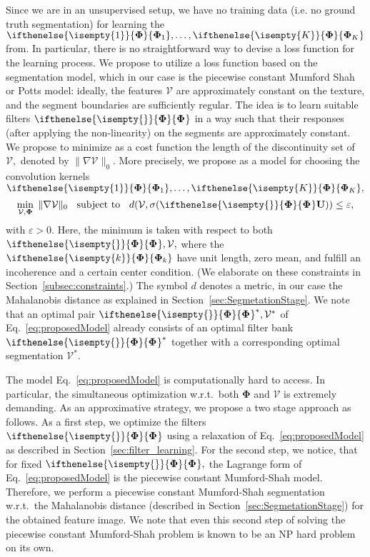 \documentclass[journal]{IEEEtran}
\newcommand{\Matrix}[1]{\mathbf{#1}}
\newcommand{\Tensor}[1]{\mathcal{#1}}
\newcommand{\St}{\textrm{\hspace{2mm} subject to \hspace{2mm}}}
\newcommand{\AOF}[1]{\ifthenelse{\isempty{#1}}{\boldsymbol{\Phi}}{\boldsymbol{\Phi}_{#1}}}
\newcommand{\SCI}{\Matrix{U}}
\begin{document}
 
Since we are in an unsupervised setup, we have no training data (i.e. no ground truth segmentation) 
for learning the $\AOF{1}, \ldots, \AOF{K}$ from.
In particular, there is no straightforward way to devise 
a loss function for the learning process.
We propose to utilize a loss function 
based on the segmentation model,
which in our case is the piecewise constant Mumford Shah or Potts model:
ideally, the features $\Tensor{V}$ are approximately
constant on the texture, and the segment boundaries are sufficiently regular.
The idea is to learn suitable filters $\AOF{}$ in 
a way such that their responses (after applying the non-linearity) on the segments 
are approximately constant.
We propose to minimize as a cost function 
the length of the discontinuity set of $\Tensor{V},$ 
denoted by $\| \nabla \Tensor{V} \|_0.$ More precisely, we propose as a model 
for choosing the convolution kernels $\AOF{1}, \ldots, \AOF{K},$
\begin{equation}
\label{eq:proposedModel}
\min_{\Tensor{V},\Matrix{\Phi}} \; \| \nabla \Tensor{V} \|_0 \St 
d(\Tensor{V},\sigma(\AOF{} \SCI)) \leq \varepsilon,
\end{equation}
with $\varepsilon>0.$  
Here, the minimum is taken with respect to both $\AOF{},\Tensor{V},$
where the $\AOF{k}$ have unit length, zero mean, and fulfill an incoherence and a certain center condition. (We elaborate on these constraints in Section~\ref{subsec:constraints}.)
The symbol $d$ denotes a metric, in our case the Mahalanobis distance
as explained in Section~\ref{sec:SegmetationStage}.
We note that an optimal pair $\AOF{}^\ast,\Tensor{V}^\ast $ of Eq.~\eqref{eq:proposedModel}
already consists of an optimal filter bank $\AOF{}^\ast$ together with a corresponding optimal segmentation $\Tensor{V}^\ast.$






The model Eq.~\eqref{eq:proposedModel} is computationally hard to access.
In particular, the simultaneous optimization w.r.t.\ both $\Matrix{\Phi}$ and $\Tensor{V}$ is extremely demanding.
As an approximative strategy, we propose a two stage approach as follows.
As a first step, we optimize the filters $\AOF{}$ using a relaxation of Eq.~\eqref{eq:proposedModel} 
as described in Section~\ref{sec:filter_learning}.
For the second step, we notice, that
for fixed $\AOF{},$  the Lagrange form of  Eq.~\eqref{eq:proposedModel} is the piecewise constant Mumford-Shah model.
Therefore, we perform a piecewise constant Mumford-Shah segmentation w.r.t.\ the Mahalanobis distance
(described in Section~\ref{sec:SegmetationStage}) for the obtained feature image.
We note that even this second step of solving the piecewise constant Mumford-Shah problem is known to be an NP hard problem on its own.
\end{document}
